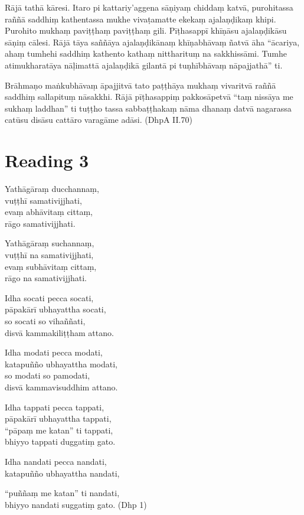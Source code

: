 Rājā tathā kāresi. Itaro pi kattariy’aggena sāṇiyaṃ chiddaṃ katvā, purohitassa raññā saddhiṃ kathentassa mukhe vivaṭamatte ekekaṃ ajalaṇḍikaṃ khipi. Purohito mukhaṃ paviṭṭhaṃ paviṭṭhaṃ gili. Pīṭhasappī khīṇāsu ajalaṇḍikāsu sāṇiṃ cālesi. Rājā tāya saññāya ajalaṇḍikānaṃ khīṇabhāvaṃ ñatvā āha “ācariya, ahaṃ tumhehi saddhiṃ kathento kathaṃ nittharituṃ na sakkhissāmi. Tumhe atimukharatāya nāḷimattā ajalaṇḍikā gilantā pi tuṇhībhāvaṃ nāpajjathā” ti.

Brāhmaṇo maṅkubhāvaṃ āpajjitvā tato paṭṭhāya mukhaṃ vivaritvā raññā saddhiṃ sallapituṃ nāsakkhi. Rājā pīṭhasappiṃ pakkosāpetvā “taṃ nissāya me sukhaṃ laddhan” ti tuṭṭho tassa sabbaṭṭhakaṃ nāma dhanaṃ datvā nagarassa catūsu disāsu cattāro varagāme adāsi. (DhpA II.70)

\section*{Reading 3}

Yathāgāraṃ ducchannaṃ,\\
vuṭṭhī samativijjhati,\\
evaṃ abhāvitaṃ cittaṃ,\\
rāgo samativijjhati.

Yathāgāraṃ suchannaṃ,\\
vuṭṭhī na samativijjhati,\\
evaṃ subhāvitaṃ cittaṃ,\\
rāgo na samativijjhati.

Idha socati pecca socati,\\
pāpakārī ubhayattha socati,\\
so socati so vihaññati,\\
disvā kammakiliṭṭham attano.

Idha modati pecca modati,\\
katapuñño ubhayattha modati,\\
so modati so pamodati,\\
disvā kammavisuddhim attano.

Idha tappati pecca tappati,\\
pāpakārī ubhayattha tappati,\\
“pāpaṃ me katan” ti tappati,\\
bhiyyo tappati duggatiṃ gato.

Idha nandati pecca nandati,\\
katapuñño ubhayattha nandati,

“puññaṃ me katan” ti nandati,\\
bhiyyo nandati suggatiṃ gato. (Dhp 1)

